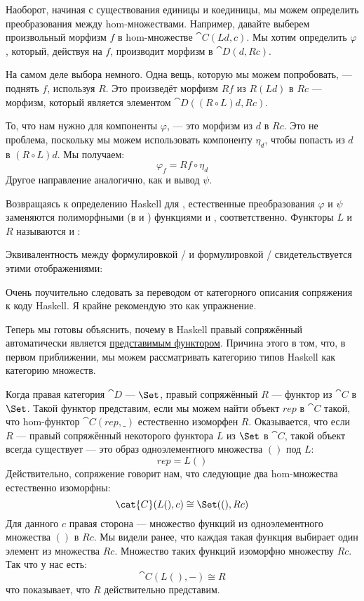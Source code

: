 Наоборот, начиная с существования единицы и коединицы, мы можем
определить преобразования между hom-множествами. Например, давайте выберем
произвольный морфизм $f$ в hom-множестве $\cat{C}(L d, c)$. Мы
хотим определить $\varphi$, который, действуя на $f$, производит
морфизм в $\cat{D}(d, R c)$.

На самом деле выбора немного. Одна вещь, которую мы можем попробовать, --- поднять
$f$, используя $R$. Это произведёт морфизм $R f$
из $R (L d)$ в $R c$ --- морфизм, который является
элементом $\cat{D}((R \circ L) d, R c)$.

То, что нам нужно для компоненты $\varphi$, --- это морфизм из
$d$ в $R c$. Это не проблема, поскольку мы можем использовать
компоненту $\eta_d$, чтобы попасть из $d$ в
$(R \circ L) d$. Мы получаем:
\[\varphi_f = R f \circ \eta_d\]
Другое направление аналогично, как и вывод $\psi$.

Возвращаясь к определению Haskell для , естественные
преобразования $\varphi$ и $\psi$ заменяются полиморфными
(в  и ) функциями  и
, соответственно. Функторы $L$ и
$R$ называются  и :

Эквивалентность между формулировкой /
и формулировкой /\allowbreak{}
свидетельствуется этими отображениями:

Очень поучительно следовать за переводом от категорного
описания сопряжения к коду Haskell. Я крайне рекомендую это
как упражнение.

Теперь мы готовы объяснить, почему в Haskell правый сопряжённый
автоматически является \hyperref[representable-functors]{представимым
  функтором}. Причина этого в том, что, в первом приближении, мы
можем рассматривать категорию типов Haskell как категорию множеств.

Когда правая категория $\cat{D}$ --- $\Set$, правый сопряжённый
$R$ --- функтор из $\cat{C}$ в $\Set$. Такой функтор
представим, если мы можем найти объект $\mathit{rep}$ в $\cat{C}$ такой,
что hom-функтор $\cat{C}(\mathit{rep}, \_)$ естественно изоморфен
$R$. Оказывается, что если $R$ --- правый сопряжённый
некоторого функтора $L$ из $\Set$ в $\cat{C}$, такой объект
всегда существует --- это образ одноэлементного множества $()$ под
$L$:
\[\mathit{rep} = L ()\]
Действительно, сопряжение говорит нам, что следующие два hom-множества
естественно изоморфны:
\[\cat{C}(L (), c) \cong \Set((), R c)\]
Для данного $c$ правая сторона --- множество функций из
одноэлементного множества $()$ в $R c$. Мы видели ранее, что
каждая такая функция выбирает один элемент из множества $R c$. Множество
таких функций изоморфно множеству $R c$. Так что у нас есть:
\[\cat{C}(L (), -) \cong R\]
что показывает, что $R$ действительно представим.


